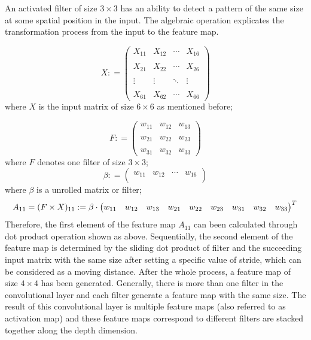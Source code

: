 \documentclass[]{krantz}
\begin{document}
An activated filter of size \(3 \times 3\) has an ability to detect a pattern of the same size at some spatial position in the input. The algebraic operation explicates the transformation process from the input to the feature map.

\[ X  : = \begin{pmatrix}                            
X_{11} & X_{12} & \cdots & X_{16}\\ \\ 
X_{21} & X_{22} & \cdots &X_{26} \\ \\
\vdots & \vdots & \ddots & \vdots \\ \\
X_{61} & X_{62} & \cdots & X_{66}
\end{pmatrix}\]
where \(X\) is the input matrix of size \(6 \times 6\) as mentioned before;

\[ F  : = \begin{pmatrix}
w_{11} & w_{12}  & w_{13}\\ \\
w_{21} & w_{22}  & w_{23} \\ \\
w_{31} & w_{32}  & w_{33}
\end{pmatrix}\]
where \(F\) denotes one filter of size \(3 \times 3\);
\[ \beta  : = \begin{pmatrix}
w_{11} & w_{12} & \cdots & w_{16}\\
\end{pmatrix}\]
where \(\beta\) is a unrolled matrix or filter;
\[ A_{11} = (F \times X)_{11}  : = 
\beta \cdot \begin{pmatrix}
w_{11} & w_{12} & w_{13} & w_{21} & w_{22} & w_{23} & w_{31} & w_{32} & w_{33}\\
\end{pmatrix}^{T}\\\]
Therefore, the first element of the feature map \(A_{11}\) can been calculated through dot product operation shown as above. Sequentially, the second element of the feature map is determined by the sliding dot product of filter and the succeeding input matrix with the same size after setting a specific value of stride, which can be considered as a moving distance. After the whole process, a feature map of size \(4 \times 4\) has been generated. Generally, there is more than one filter in the convolutional layer and each filter generate a feature map with the same size. The result of this convolutional layer is multiple feature maps (also referred to as activation map) and these feature maps correspond to different filters are stacked together along the depth dimension.
\end{document}
